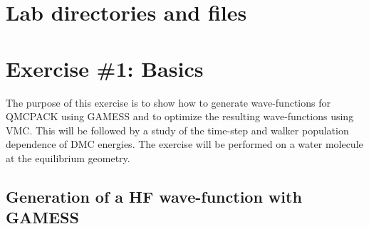 \section{Lab directories and files}



\section{Exercise \#1: Basics}

The purpose of this exercise is to show how to generate wave-functions for QMCPACK
using GAMESS and to optimize the resulting wave-functions using VMC. This will be
followed by a study of the time-step and walker population dependence of DMC energies.
The exercise will be performed on a water molecule at the equilibrium geometry.


\subsection{Generation of a HF wave-function with GAMESS}

